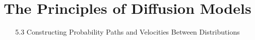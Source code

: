 ﻿%

\graphicspath{{../images/}}
\title{The Principles of Diffusion Models}
\subtitle{5.3 Constructing Probability Paths and Velocities Between Distributions}


\begin{frame}
    \titlepage
\end{frame}


